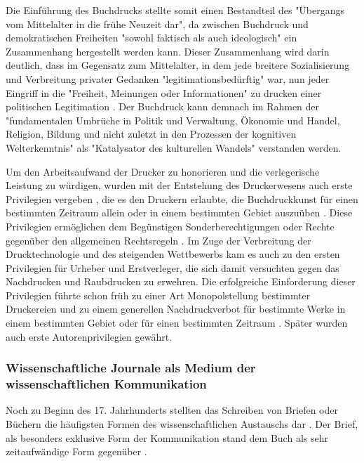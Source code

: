 Die Einführung des Buchdrucks stellte somit einen Bestandteil des "Übergangs vom Mittelalter in die frühe Neuzeit dar"\cite{lange2008medienwettbewerb}, da zwischen Buchdruck und demokratischen Freiheiten "sowohl faktisch als auch ideologisch" \cite{suchen} ein Zusammenhang hergestellt werden kann. Dieser Zusammenhang wird darin deutlich, dass im Gegensatz zum Mittelalter, in dem jede breitere Sozialisierung und Verbreitung privater Gedanken "legitimationsbedürftig" war, nun jeder Eingriff in die "Freiheit, Meinungen oder Informationen" zu drucken einer politischen Legitimation \cite{giesecke_1991_buchdruck}. Der Buchdruck kann demnach im Rahmen der "fundamentalen Umbrüche in Politik und Verwaltung, Ökonomie und Handel, Religion, Bildung und nicht zuletzt in den Prozessen der kognitiven Welterkenntnis" \cite{pscheida_2010_wikipedia} als "Katalysator des kulturellen Wandels"\cite{giesecke_1991_buchdruck} verstanden werden.

Um den Arbeitsaufwand der Drucker zu honorieren und die verlegerische Leistung zu würdigen\cite{szilagyi_2011_leistungsschutzrecht}, wurden mit der Entstehung des Druckerwesens auch erste Privilegien vergeben \cite{gieseke_1995_privileg}, die es den Druckern erlaubte, die Buchdruckkunst für einen bestimmten Zeitraum allein oder in einem bestimmten Gebiet auszuüben \cite{martin2008publizistische} \cite{koller_1995_Urheberrecht}. Diese Privilegien ermöglichen dem Begünstigen Sonderberechtigungen oder Rechte gegenüber den allgemeinen Rechtsregeln \cite{jaenich_2002_geistiges}. Im Zuge der Verbreitung der Drucktechnologie und des steigenden Wettbewerbs kam es auch zu den ersten Privilegien für Urheber und Erstverleger, die sich damit versuchten gegen das Nachdrucken und Raubdrucken zu erwehren. Die erfolgreiche Einforderung dieser Privilegien führte schon früh zu einer Art Monopolstellung bestimmter Druckereien und zu einem generellen Nachdruckverbot für bestimmte Werke in einem bestimmten Gebiet oder für einen bestimmten Zeitraum \cite{szilagyi_2011_leistungsschutzrecht}. Später wurden auch erste Autorenprivilegien gewährt.

\subsubsection{Wissenschaftliche Journale als Medium der wissenschaftlichen Kommunikation}

Noch zu Beginn des 17. Jahrhunderts stellten das Schreiben von Briefen oder Büchern die häufigsten Formen des wissenschaftlichen Austauschs dar \cite{porter_1964_scientific}. Der Brief, als besonders exklusive Form der Kommunikation stand dem Buch als sehr zeitaufwändige Form gegenüber \cite{fecher_hiig_2014}.

